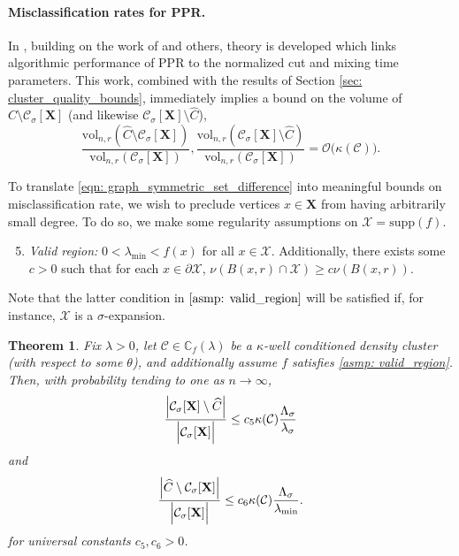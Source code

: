 \documentclass{article}
\newcommand{\vol}{\mathrm{vol}}
\newcommand{\abs}[1]{\left \lvert #1 \right \rvert}
\newcommand{\1}{\mathbf{1}}
\newcommand{\Xbf}{\mathbf{X}}
\newcommand{\Cbb}{\mathbb{C}}
\newcommand{\Cset}{\mathcal{C}}
\newcommand{\Csig}{\Cset_{\sigma}}
\newcommand{\ppr}{{\sc PPR}}
\theoremstyle{aldenthm}
\newtheorem{theorem}{Theorem}
\theoremstyle{aldenrmrk}
\begin{document}
\paragraph{Misclassification rates for \ppr.}

In \cite{zhu2013}, building on the work of \cite{andersen2006} and others, theory is developed which links algorithmic performance of PPR to the normalized cut and mixing time parameters. This work, combined with the results of Section \ref{sec: cluster_quality_bounds}, immediately implies a bound on the volume of $\widehat{C} \setminus \Csig[\Xbf]$ (and likewise $\Csig[\Xbf] \setminus \widehat{C}$),
\begin{equation}
\label{eqn: graph_symmetric_set_difference}
\frac{\vol_{n,r}(\widehat{C} \setminus \Csig[\Xbf])}{\vol_{n,r}(\Csig[\Xbf])}, \frac{\vol_{n,r}(\Csig[\Xbf] \setminus \widehat{C})}{\vol_{n,r}(\Csig[\Xbf])} = \mathcal{O}\bigl( \kappa(\Cset) \bigr).
\end{equation}

To translate \eqref{eqn: graph_symmetric_set_difference} into meaningful bounds on misclassification rate, we wish to preclude vertices $x \in \Xbf$ from having arbitrarily small degree. To do so, we make some regularity assumptions on $\mathcal{X} = \mathrm{supp}(f)$.
\begin{enumerate}[label=(A\arabic*)]
	\setcounter{enumi}{4}
	\item 
	\label{asmp: valid_region}
	\emph{Valid region:} $0 < \lambda_{\min} < f(x)$ for all $x \in \mathcal{X}$. Additionally, there exists some $c > 0$ such that for each $x \in \partial \mathcal{X}$, $\nu(B(x,r) \cap \mathcal{X}) \geq c\nu(B(x,r))$.
\end{enumerate}
Note that the latter condition in $\ref{asmp: valid_region}$ will be satisfied if, for instance, $\mathcal{X}$ is a $\sigma$-expansion. 

\begin{theorem}
	\label{thm: misclassification_rate}
	Fix $\lambda > 0$, let $\Cset \in \Cbb_f(\lambda)$ be a $\kappa$-well conditioned density cluster (with respect to some $\theta$), and additionally assume $f$ satisfies \ref{asmp: valid_region}. Then, with probability tending to one as $n \to \infty$,
	\begin{equation}
	\label{eqn: misclassification_rate_ub}
	\frac{\abs{\Csig[\Xbf] \setminus \widehat{C}}}{\Bigl|\Csig[\Xbf]\Bigr|} \leq c_5 \kappa(\Cset) \frac{\Lambda_{\sigma}}{\lambda_{\sigma}}
	\end{equation}
	and
	\begin{equation}
	\label{eqn: misclassification_rate_ub_2}
	\frac{\abs{\widehat{C} \setminus \Csig[\Xbf]}}{\Bigl|\Csig[\Xbf]\Bigr|} \leq c_6 \kappa(\Cset) \frac{\Lambda_{\sigma}}{\lambda_{\min}}.
	\end{equation}
	for universal constants $c_5, c_6 > 0$. 
\end{theorem}
\end{document}
